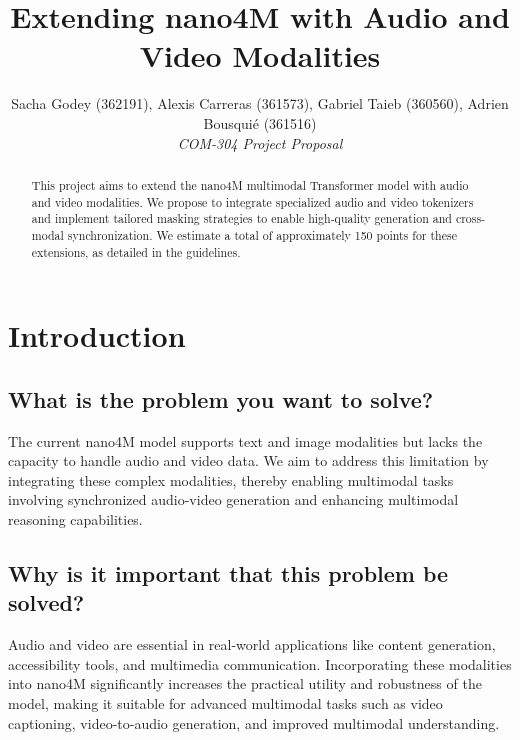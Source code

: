 \documentclass[10pt,conference,compsocconf]{IEEEtran}
\begin{document}
\title{Extending nano4M with Audio and Video Modalities}

\author{
  Sacha Godey (362191), Alexis Carreras (361573), Gabriel Taieb (360560), Adrien Bousquié (361516)\\
  \textit{COM-304 Project Proposal}
}

\maketitle

\begin{abstract}
This project aims to extend the nano4M multimodal Transformer model with audio and video modalities. We propose to integrate specialized audio and video tokenizers and implement tailored masking strategies to enable high-quality generation and cross-modal synchronization. We estimate a total of approximately 150 points for these extensions, as detailed in the guidelines.
\end{abstract}

\section{Introduction}

\subsection{What is the problem you want to solve?}
The current nano4M model supports text and image modalities but lacks the capacity to handle audio and video data. We aim to address this limitation by integrating these complex modalities, thereby enabling multimodal tasks involving synchronized audio-video generation and enhancing multimodal reasoning capabilities.

\subsection{Why is it important that this problem be solved?}
Audio and video are essential in real-world applications like content generation, accessibility tools, and multimedia communication. Incorporating these modalities into nano4M significantly increases the practical utility and robustness of the model, making it suitable for advanced multimodal tasks such as video captioning, video-to-audio generation, and improved multimodal understanding.

\end{document}

